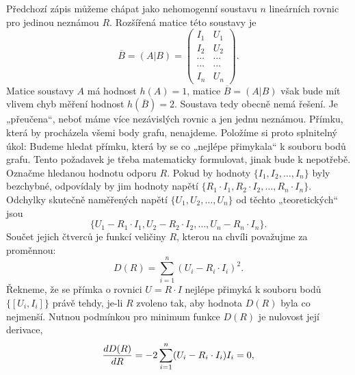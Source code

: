      Předchozí zápis můžeme chápat jako nehomogenní soustavu \(n\) lineárních rovnic pro jedinou
      neznámou \(R\). Rozšířená matice této soustavy je
      \begin{equation*}
        \overline{B} = (A|B) = 
          \left(
            \begin{array}{c|c}
              I_1    & U_1     \\
              I_2    & U_2     \\
              \cdots & \cdots  \\
              \cdots & \cdots  \\
              I_n    & U_n
            \end{array}
          \right).
      \end{equation*}
      Matice soustavy \(A\) má hodnost \(h(A) = 1\), matice \(\overline{B} = (A|B)\) však bude mít 
      vlivem chyb měření hodnost \(h(\overline{B}) = 2\). Soustava tedy obecně nemá řešení. Je 
      „přeučena“, neboť máme více nezávislých rovnic a jen jednu neznámou. Přímku, která by 
      procházela všemi body grafu, nenajdeme. Položíme si proto splnitelný úkol: Budeme hledat 
      přímku, která by se co „nejlépe přimykala“ k souboru bodů grafu. Tento požadavek je třeba 
      matematicky formulovat, jinak bude k nepotřebě. Označme hledanou hodnotu odporu \(R\). Pokud 
      by hodnoty \(\lbrace I_1, I_2, \ldots, I_n \rbrace\) byly bezchybné, odpovídaly by jim 
      hodnoty napětí \(\lbrace R_1\cdot I_1, R_2\cdot I_2, \ldots, R_n\cdot I_n \rbrace\). Odchylky 
      skutečně naměřených napětí \(\lbrace U_1, U_2, \ldots, U_n \rbrace\) od těchto „teoretických“ 
      jsou
      \begin{equation*}
        \lbrace U_1 - R_1\cdot I_1, U_2 - R_2\cdot I_2, \ldots, U_n - R_n\cdot I_n \rbrace.
      \end{equation*}
      Součet jejich čtverců je funkcí veličiny \(R\), kterou na chvíli považujme za proměnnou:
      \begin{equation*}
        D(R) = \sum_{i = 1}^{n}(U_i - R_i\cdot I_i)^2.
      \end{equation*}
      Řekneme, že se přímka o rovnici \(U = R\cdot I\) nejlépe přimyká k souboru bodů \(\lbrace[ 
      U_i, I_i]\rbrace\) právě tehdy, je-li \(R\) zvoleno tak, aby hodnota \(D(R)\) byla co 
      nejmenší. Nutnou podmínkou pro minimum funkce \(D(R)\) je nulovost její derivace,
      \begin{equation*}
        \dfrac{d D(R)}{d R} = -2\sum_{i = 1}^{n}(U_i - R_i\cdot I_i)I_i = 0,
      \end{equation*}
